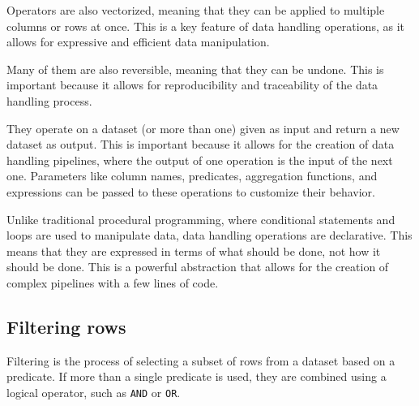 
Operators are also vectorized, meaning that they can be applied to multiple columns or
rows at once.  This is a key feature of data handling operations, as it allows for
expressive and efficient data manipulation.

Many of them are also reversible, meaning that they can be undone.  This is important
because it allows for reproducibility and traceability of the data handling process.

They operate on a dataset (or more than one) given as input and return a new dataset as
output.  This is important because it allows for the creation of data handling pipelines,
where the output of one operation is the input of the next one.  Parameters like column
names, predicates, aggregation functions, and expressions can be passed to these operations to
customize their behavior.

Unlike traditional procedural programming, where conditional statements and loops are used
to manipulate data, data handling operations are declarative.  This means that they are
expressed in terms of what should be done, not how it should be done.  This is a powerful
abstraction that allows for the creation of complex pipelines with a few lines of code.

\subsection{Filtering rows}

Filtering is the process of selecting a subset of rows from a dataset based on a
predicate.  If more than a single predicate is used, they are combined using a logical
operator, such as \texttt{AND} or \texttt{OR}.

